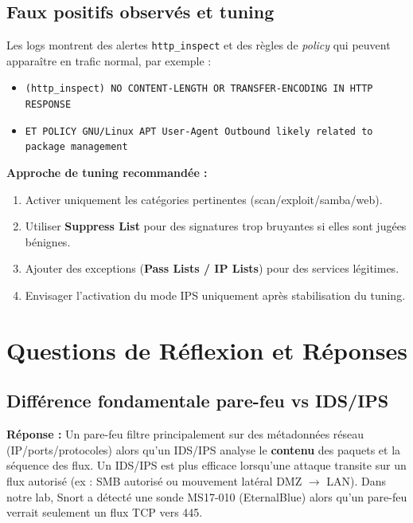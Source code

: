 \documentclass[12pt,a4paper,openany]{report}
\begin{document}
	\section{Faux positifs observés et tuning}
	
	Les logs montrent des alertes \texttt{http\_inspect} et des règles de \textit{policy} qui peuvent apparaître en trafic normal, par exemple :
	\begin{itemize}
		\item \texttt{(http\_inspect) NO CONTENT-LENGTH OR TRANSFER-ENCODING IN HTTP RESPONSE}
		\item \texttt{ET POLICY GNU/Linux APT User-Agent Outbound likely related to package management}
	\end{itemize}
	
	\textbf{Approche de tuning recommandée :}
	\begin{enumerate}[leftmargin=*]
		\item Activer uniquement les catégories pertinentes (scan/exploit/samba/web).
		\item Utiliser \textbf{Suppress List} pour des signatures trop bruyantes si elles sont jugées bénignes.
		\item Ajouter des exceptions (\textbf{Pass Lists / IP Lists}) pour des services légitimes.
		\item Envisager l'activation du mode IPS uniquement après stabilisation du tuning.
	\end{enumerate}
	
	\chapter{Questions de Réflexion et Réponses}
	
	\section{Différence fondamentale pare-feu vs IDS/IPS}
	
	\textbf{Réponse :} Un pare-feu filtre principalement sur des métadonnées réseau (IP/ports/protocoles) alors qu'un IDS/IPS analyse le \textbf{contenu} des paquets et la séquence des flux. Un IDS/IPS est plus efficace lorsqu'une attaque transite sur un flux autorisé (ex : SMB autorisé ou mouvement latéral DMZ $\rightarrow$ LAN). Dans notre lab, Snort a détecté une sonde MS17-010 (EternalBlue) alors qu'un pare-feu verrait seulement un flux TCP vers 445.
	
\end{document}
